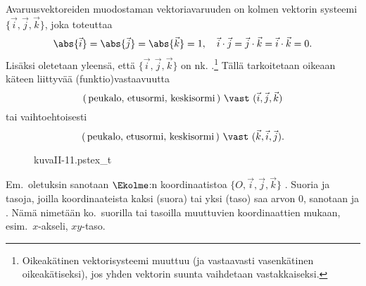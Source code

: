 Avaruusvektoreiden muodostaman vektoriavaruuden
%
 on kolmen vektorin 
systeemi $\{\vec i, \vec j, \vec k\}$, joka toteuttaa
\[
\abs{\vec i} = \abs{\vec j} = \abs{\vec k} = 1, \quad 
\vec i \cdot \vec j = \vec j \cdot \vec k = \vec i \cdot \vec k = 0.
\]
Lisäksi oletetaan yleensä, että $\{\vec i, \vec j, \vec k\}$ on nk.
%
.\footnote[2]{Oikeakätinen vektorisysteemi muuttuu 
(ja vastaavasti vasenkätinen oikeakätiseksi), jos yhden vektorin suunta vaihdetaan
vastakkaiseksi. } Tällä tarkoitetaan oikeaan käteen
liittyvää (funktio)vastaavuutta
\[
(\,\text{peukalo},\,\text{etusormi},\,\text{keskisormi}\,)\ \vast\ (\vec i,\vec j,\vec k)
\]
tai vaihtoehtoisesti
\[
(\,\text{peukalo},\,\text{etusormi},\,\text{keskisormi}\,)\ \vast\ (\vec k,\vec i,\vec j).
\] 
\begin{figure}[H]
\begin{center}
{kuvaII-11.pstex_t}
\end{center}
\end{figure}
Em.\ oletuksin sanotaan $\Ekolme$:n koordinaatistoa $\{O,\vec i,\vec j,\vec k\}$
% 
. Suoria ja tasoja, joilla koordinaateista kaksi (suora) tai yksi (taso)
saa arvon $0$, sanotaan  ja .
Nämä nimetään ko.\ suorilla tai tasoilla muuttuvien koordinaattien mukaan, esim.\
$x$-akseli, $xy$-taso.

